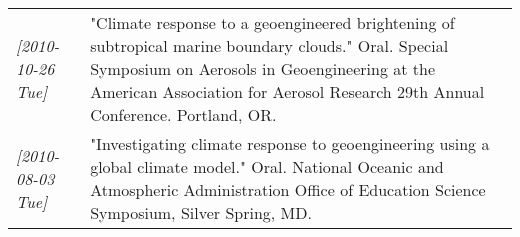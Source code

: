 \documentclass[12pt,letterpaper]{shillcv}
\begin{document}
\begin{center}
\begin{tabularx}{\textwidth}{lX}
\textit{[2010-10-26 Tue]} & "Climate response to a geoengineered brightening of subtropical marine boundary clouds."  Oral.  Special Symposium on Aerosols in Geoengineering at the American Association for Aerosol Research 29th Annual Conference.  Portland, OR.\\
\textit{[2010-08-03 Tue]} & "Investigating climate response to geoengineering using a global climate model."  Oral.  National Oceanic and Atmospheric Administration Office of Education Science Symposium, Silver Spring, MD.\\
\end{tabularx}
\end{center}
\end{document}
